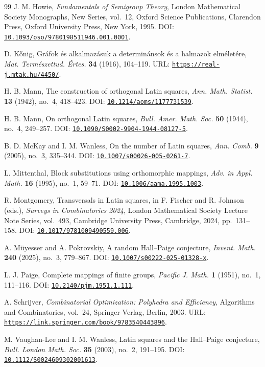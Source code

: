 \documentclass[11pt]{article}
\newcommand{\doilink}[1]{\href{https://doi.org/#1}{\nolinkurl{#1}}}
\newcommand{\weblink}[1]{\href{#1}{\nolinkurl{#1}}}
\theoremstyle{plain}
\theoremstyle{remark}
\theoremstyle{definition}
\theoremstyle{plain}
\begin{document}
\begin{thebibliography}{99}
J. M. Howie,
\emph{Fundamentals of Semigroup Theory},
London Mathematical Society Monographs, New Series, vol.~12,
Oxford Science Publications, Clarendon Press, Oxford University Press,
New York, 1995.
DOI: \doilink{10.1093/oso/9780198511946.001.0001}.

D. K\H{o}nig,
Gr\'afok \'es alkalmaz\'asuk a determin\'ansok \'es a halmazok elm\'elet\'ere,
\textit{Mat. Term\'eszettud. \'Ertes.} \textbf{34} (1916), 104--119.
URL: \weblink{https://real-j.mtak.hu/4450/}.

H. B. Mann,
The construction of orthogonal Latin squares,
\textit{Ann. Math. Statist.} \textbf{13} (1942), no.~4, 418--423.
DOI: \doilink{10.1214/aoms/1177731539}.

H. B. Mann,
On orthogonal Latin squares,
\textit{Bull. Amer. Math. Soc.} \textbf{50} (1944), no.~4, 249--257.
DOI: \doilink{10.1090/S0002-9904-1944-08127-5}.

B. D. McKay and I. M. Wanless,
On the number of Latin squares,
\textit{Ann. Comb.} \textbf{9} (2005), no.~3, 335--344.
DOI: \doilink{10.1007/s00026-005-0261-7}.

L. Mittenthal,
Block substitutions using orthomorphic mappings,
\textit{Adv. in Appl. Math.} \textbf{16} (1995), no.~1, 59--71.
DOI: \doilink{10.1006/aama.1995.1003}.

R. Montgomery,
Transversals in Latin squares,
in F. Fischer and R. Johnson (eds.),
\emph{Surveys in Combinatorics 2024},
London Mathematical Society Lecture Note Series, vol.~493,
Cambridge University Press, Cambridge, 2024, pp.~131--158.
DOI: \doilink{10.1017/9781009490559.006}.

A. M\"uyesser and A. Pokrovskiy,
A random Hall--Paige conjecture,
\textit{Invent. Math.} \textbf{240} (2025), no.~3, 779--867.
DOI: \doilink{10.1007/s00222-025-01328-x}.

L. J. Paige,
Complete mappings of finite groups,
\textit{Pacific J. Math.} \textbf{1} (1951), no.~1, 111--116.
DOI: \doilink{10.2140/pjm.1951.1.111}.

A. Schrijver,
\emph{Combinatorial Optimization: Polyhedra and Efficiency},
Algorithms and Combinatorics, vol.~24,
Springer-Verlag, Berlin, 2003.
URL: \weblink{https://link.springer.com/book/9783540443896}.


M. Vaughan-Lee and I. M. Wanless,
Latin squares and the Hall--Paige conjecture,
\textit{Bull. London Math. Soc.} \textbf{35} (2003), no.~2, 191--195.
DOI: \doilink{10.1112/S0024609302001613}.


\end{thebibliography}
\end{document}
